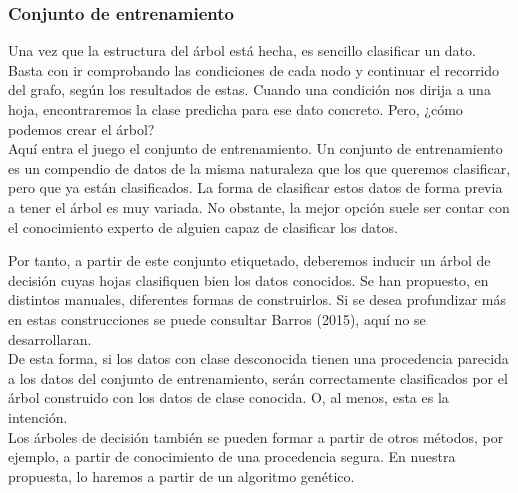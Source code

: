 			\subsubsection{Conjunto de entrenamiento}
			Una vez que la estructura del \'arbol est\'a hecha, es sencillo clasificar un dato. Basta con ir comprobando las condiciones de cada nodo y continuar el recorrido del grafo, seg\'un los resultados de estas. Cuando una condici\'on nos dirija a una hoja, encontraremos la clase predicha para ese dato concreto. Pero, ¿c\'omo podemos crear el \'arbol?\\
			
			Aqu\'i entra el juego el conjunto de entrenamiento. Un conjunto de entrenamiento es un compendio de datos de la misma naturaleza que los que queremos clasificar, pero que ya est\'an clasificados. La forma de clasificar estos datos de forma previa a tener el \'arbol es muy variada. No obstante, la mejor opci\'on suele ser contar con el conocimiento experto de alguien capaz de clasificar los datos.
			
			Por tanto, a partir de este conjunto etiquetado, deberemos inducir un \'arbol de decisi\'on cuyas hojas clasifiquen bien los datos conocidos. Se han propuesto, en distintos manuales, diferentes formas de construirlos. Si se desea profundizar m\'as en estas construcciones se puede consultar Barros (2015), aqu\'i no se desarrollaran.\\
			
			De esta forma, si los datos con clase desconocida tienen una procedencia parecida a los datos del conjunto de entrenamiento, ser\'an correctamente clasificados por el \'arbol construido con los datos de clase conocida. O, al menos, esta es la intenci\'on.\\
			
			Los \'arboles de decisi\'on tambi\'en se pueden formar a partir de otros m\'etodos, por ejemplo, a partir de conocimiento de una procedencia segura. En nuestra propuesta, lo haremos a partir de un algoritmo gen\'etico.
	